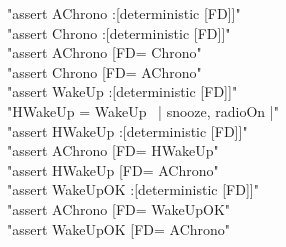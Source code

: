 \begin{assert}
"assert AChrono :[deterministic [FD]]"\\
\also"assert Chrono :[deterministic [FD]]"\\
\also"assert AChrono [FD= Chrono"\\
\also"assert Chrono [FD= AChrono"\\

\also"assert WakeUp :[deterministic [FD]]"\\

\also"HWakeUp = WakeUp \ {| snooze, radioOn |}"\\

\also"assert HWakeUp :[deterministic [FD]]"\\

\also"assert AChrono [FD= HWakeUp"\\
\also"assert HWakeUp [FD= AChrono"\\

\also"assert WakeUpOK :[deterministic [FD]]"\\

\also"assert AChrono [FD= WakeUpOK"\\
\also"assert WakeUpOK [FD= AChrono"\\
\end{assert}
